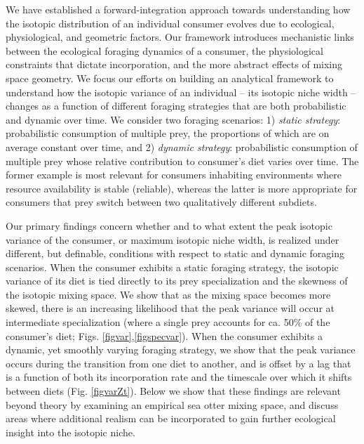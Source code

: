 \documentclass{article}
\begin{document}
We have established a forward-integration approach towards understanding how the isotopic distribution of an individual consumer evolves due to ecological, physiological, and geometric factors.
Our framework introduces mechanistic links between the ecological foraging dynamics of a consumer, the physiological constraints that dictate incorporation, and the more abstract effects of mixing space geometry.
We focus our efforts on building an analytical framework to understand how the isotopic variance of an individual -- its isotopic niche width -- changes as a function of different foraging strategies that are both probabilistic and dynamic over time.
We consider two foraging scenarios:
1) {\it static strategy}: probabilistic consumption of multiple prey, the proportions of which are on average constant over time, and
2) {\it dynamic strategy}: probabilistic consumption of multiple prey whose relative contribution to consumer's diet varies over time.
The former example is most relevant for consumers inhabiting environments where resource availability is stable (reliable), whereas the latter is more appropriate for consumers that prey switch between two qualitatively different subdiets.

Our primary findings concern whether and to what extent the peak isotopic variance of the consumer, or maximum isotopic niche width, is realized under different, but definable, conditions with respect to static and dynamic foraging scenarios.
When the consumer exhibits a static foraging strategy, the isotopic variance of its diet is tied directly to its prey specialization and the skewness of the isotopic mixing space.
We show that as the mixing space becomes more skewed, there is an increasing likelihood that the peak variance will occur at intermediate specialization (where a single prey accounts for ca. 50\% of the consumer's diet; Figs. \ref{figvar},\ref{figspecvar}).
When the consumer exhibits a dynamic, yet smoothly varying foraging strategy, we show that the peak variance occurs during the transition from one diet to another, and is offset by a lag that is a function of both its incorporation rate and the timescale over which it shifts between diets (Fig. \ref{figvarZt}).
Below we show that these findings are relevant beyond theory by examining an empirical sea otter mixing space, and discuss areas where additional realism can be incorporated to gain further ecological insight into the isotopic niche.
\end{document}
